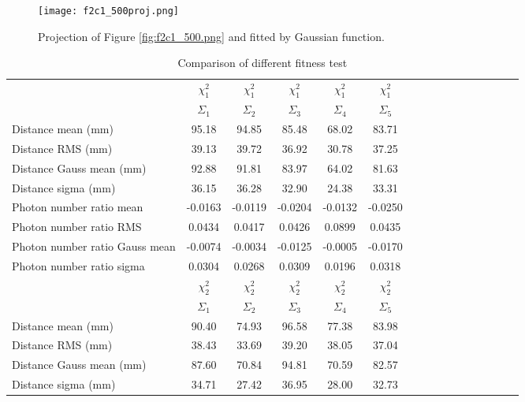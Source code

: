 \begin{figure}
    \centering
    \texttt{[image: f2c1\_500proj.png]}
    \caption[Projection of coordinate and energy reconstruction result in Figure \ref{fig:f2c1_500.png}]
{
Projection of Figure \ref{fig:f2c1_500.png} and fitted by Gaussian function.
}
    \label{fig:f2c1_500proj.png}
    \end{figure}




\begin{table}
\centering
\caption{Comparison of different fitness test}
\label{tab:GAResultSummary}
\begin{tabular}{lccccccccccccccc}
\hline
 & $\chi^2_1$ & $\chi^2_1$ & $\chi^2_1$ & $\chi^2_1$ & $\chi^2_1$ \\
 & $\Sigma_1$ & $\Sigma_2$ & $\Sigma_3$ & $\Sigma_4$ & $\Sigma_5$ \\
\hline
Distance mean (mm)             & 95.18   &94.85   &85.48   &68.02   &83.71  \\ 
Distance RMS (mm)              & 39.13   &39.72   &36.92   &30.78   &37.25  \\ 
Distance Gauss mean (mm)       & 92.88   &91.81   &83.97   &64.02   &81.63  \\ 
Distance sigma (mm)            & 36.15   & 36.28   &32.90   &24.38   &33.31 \\ 
Photon number ratio mean       & -0.0163 &-0.0119 &-0.0204 &-0.0132 &-0.0250\\ 
Photon number ratio RMS        & 0.0434  &0.0417  &0.0426  &0.0899  &0.0435 \\ 
Photon number ratio Gauss mean & -0.0074 &-0.0034 &-0.0125 &-0.0005 &-0.0170\\ 
Photon number ratio sigma      & 0.0304  &0.0268  &0.0309  &0.0196  &0.0318 \\ 
\hline
\hline
& $\chi^2_2$ & $\chi^2_2$ & $\chi^2_2$ & $\chi^2_2$ & $\chi^2_2$ \\
 & $\Sigma_1$ & $\Sigma_2$ & $\Sigma_3$ & $\Sigma_4$ & $\Sigma_5$ \\
\hline
Distance mean (mm)             &90.40   &74.93   &96.58   &77.38   &83.98   \\
Distance RMS (mm)              &38.43   &33.69   &39.20   &38.05   &37.04   \\
Distance Gauss mean (mm)       &87.60   &70.84   &94.81   &70.59   &82.57   \\
Distance sigma (mm)             &34.71  &27.42   &36.95   &28.00   &32.73      \\

\end{tabular}
\end{table}
